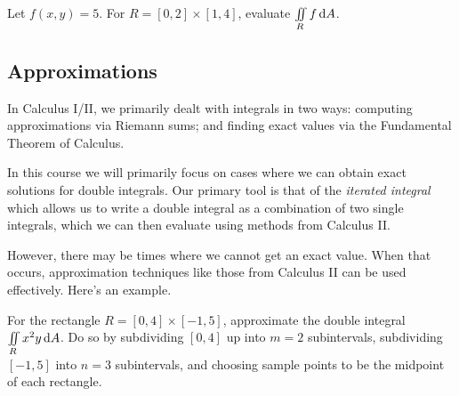 \begin{ex}\label{ex:double-integral-via-geometry}
    Let $f(x,y)=5$. For $R=[0,2]\times[1,4]$, evaluate $\iint\limits_R f\mathop{}\!\mathrm{d} A$.
\end{ex}

\vfill 

\pagebreak 

\subsection{Approximations}
In Calculus I/II, we primarily dealt with integrals in two ways: computing approximations via Riemann sums; and finding exact values via the Fundamental Theorem of Calculus.

In this course we will primarily focus on cases where we can obtain exact solutions for double integrals. Our primary tool is that of the \emph{iterated integral} which allows us to write a double integral as a combination of two single integrals, which we can then evaluate using methods from Calculus II. 

However, there may be times where we cannot get an exact value. When that occurs, approximation techniques like those from Calculus II can be used effectively. Here's an example.
\begin{ex}
    For the rectangle $R=[0,4]\times[-1,5]$, approximate the double integral $\iint\limits_R x^2y\mathop{}\!\mathrm{d} A$. Do so by subdividing $[0,4]$ up into $m=2$ subintervals, subdividing $[-1,5]$ into $n=3$ subintervals, and choosing sample points to be the midpoint of each rectangle.
\end{ex}


